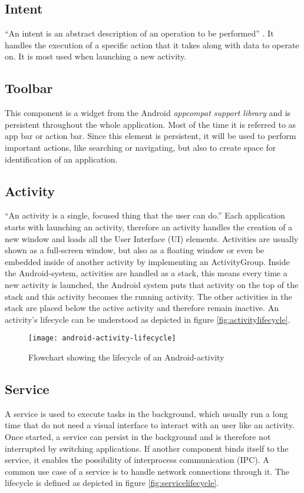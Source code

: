 \subsection{Intent}
``An intent is an abstract description of an operation to be performed'' \autocite{AndroidIntent}. It handles the execution of a specific action that it takes along with data to operate on. It is most used when launching a new activity.

\subsection{Toolbar}
This component is a widget from the Android \emph{appcompat support library} and is persistent throughout the whole application. Most of the time it is referred to as app bar or action bar. Since this element is persistent, it will be used to perform important actions, like searching or navigating, but also to create space for identification of an application.

\subsection{Activity}
``An activity is a single, focused thing that the user can do.'' \autocite{AndroidActivity} Each application starts with launching an activity, therefore an activity handles the creation of a new window and loads all the User Interface (UI) elements. Activities are usually shown as a full-screen window, but also as a floating window or even be embedded inside of another activity by implementing an ActivityGroup. Inside the Android-system, activities are handled as a stack, this means every time a new activity is launched, the Android system puts that activity on the top of the stack and this activity becomes the running activity. The other activities in the stack are placed below the active activity and therefore remain inactive. An activity's lifecycle can be understood as depicted in figure \vref{fig:activitylifecycle}.

\begin{figure}[H]
    \centering
    \texttt{[image: android-activity-lifecycle]}
    \caption{Flowchart showing the lifecycle of an Android-activity}
    \label{fig:activitylifecycle}
\end{figure}

\subsection{Service}
A service is used to execute tasks in the background, which usually run a long time that do not need a visual interface to interact with an user like an activity. Once started, a service can persist in the background and is therefore not interrupted by switching applications. If another component binds itself to the service, it enables the possibility of interprocess communication (IPC). A common use case of a service is to handle network connections through it. The lifecycle is defined as depicted in figure \vref{fig:servicelifecycle}.

